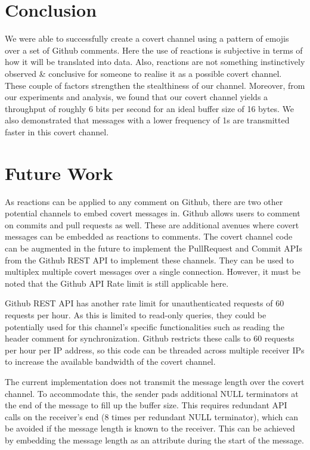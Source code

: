 \documentclass[conference]{IEEEtran}
\begin{document}
\section{Conclusion}
We were able to successfully create a covert channel using a pattern of emojis over a set of Github comments. Here the use of reactions is subjective in terms of how it will be translated into data. Also, reactions are not something instinctively observed \& conclusive for someone to realise it as a possible covert channel. These couple of factors strengthen the stealthiness of our channel. Moreover, from our experiments and analysis, we found that our covert channel yields a throughput of roughly 6 bits per second for an ideal buffer size of 16 bytes. We also demonstrated that messages with a lower frequency of 1s are transmitted faster in this covert channel. 

\section{Future Work}
As reactions can be applied to any comment on Github, there are two other potential channels to embed covert messages in. Github allows users to comment on commits and pull requests as well. These are additional avenues where covert messages can be embedded as reactions to comments. The covert channel code can be augmented in the future to implement the PullRequest and Commit APIs from the Github REST API to implement these channels. They can be used to multiplex multiple covert messages over a single connection. However, it must be noted that the Github API Rate limit is still applicable here. 

Github REST API has another rate limit for unauthenticated requests of 60 requests per hour. As this is limited to read-only queries, they could be potentially used for this channel's specific functionalities such as reading the header comment for synchronization. Github restricts these calls to 60 requests per hour per IP address, so this code can be threaded across multiple receiver IPs to increase the available bandwidth of the covert channel.

The current implementation does not transmit the message length over the covert channel. To accommodate this, the sender pads additional NULL terminators at the end of the message to fill up the buffer size. This requires redundant API calls on the receiver's end (8 times per redundant NULL terminator), which can be avoided if the message length is known to the receiver. This can be achieved by embedding the message length as an attribute during the start of the message.
\end{document}
